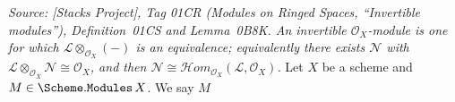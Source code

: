 \begin{definition}
  \label{def:scheme_modules_isinvertible}
  \textit{Source: [Stacks Project], Tag 01CR (Modules on Ringed Spaces,
  ``Invertible modules''), Definition~01CS and Lemma~0B8K. An invertible
  \(\mathcal{O}_X\)-module is one for which \(\mathcal{L} \otimes_{\mathcal{O}_X}
  (-)\) is an equivalence; equivalently there exists \(\mathcal{N}\) with
  \(\mathcal{L} \otimes_{\mathcal{O}_X} \mathcal{N} \cong \mathcal{O}_X\), and
  then \(\mathcal{N} \cong \mathcal{H}om_{\mathcal{O}_X}(\mathcal{L},
  \mathcal{O}_X)\).}
  Let \(X\) be a scheme and \(M \in \Scheme.\mathtt{Modules}\,X\). We say \(M\)

\end{definition}
